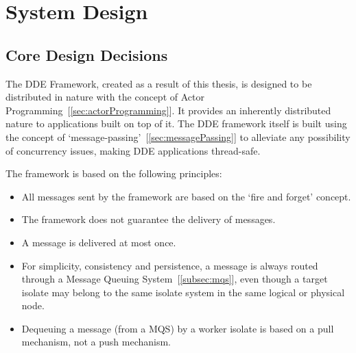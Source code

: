 \chapter{System Design}
\label{chapter:system_design}

\section{Core Design Decisions}
  The \acrshort{DDE} Framework, created as a result of this thesis, is designed to be distributed in nature with the concept of Actor Programming~[\autoref{sec:actorProgramming}]. It provides an inherently distributed nature to applications built on top of it. The \acrshort{DDE} framework itself is built using the concept of ‘message-passing’~[\autoref{sec:messagePassing}] to alleviate any possibility of concurrency issues, making \acrshort{DDE} applications thread-safe.

  The framework is based on the following principles:
\begin{itemize}
  \item All messages sent by the framework are based on the ‘fire and forget’ concept.
  \item The framework does not guarantee the delivery of messages.
  \item A message is delivered at most once.
  \item For simplicity, consistency and persistence, a message is always routed through a Message Queuing System~[\autoref{subsec:mqs}], even though a target isolate may belong to the same isolate system in the same logical or physical node.
  \item Dequeuing a message (from a MQS) by a worker isolate is based on a pull mechanism, not a push mechanism.
\end{itemize}


